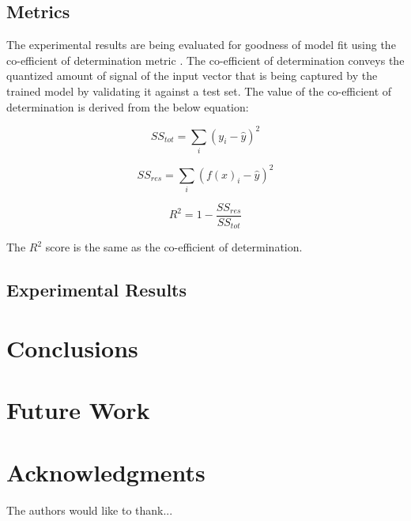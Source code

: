 \documentclass[conference]{IEEEtran}
\begin{document}
\subsection{Metrics}
The experimental results are being evaluated for goodness of model fit using the co-efficient of determination metric \cite{jaeger1990statistics}.
The co-efficient of determination conveys the quantized amount of signal of the input vector that is being captured by the trained model by validating it against a test set. The value of the co-efficient of determination is derived from the below equation:

\begin{equation}
\displaystyle SS_{tot} = \sum_{i} (y_i - \hat{y})^2
\end{equation}

\begin{equation}
\displaystyle SS_{res} = \sum_{i} (f(x)_i - \hat{y})^2
\end{equation}

\begin{equation}
\displaystyle R^2 = 1 - \frac{SS_{res}}{SS_{tot}}
\end{equation}

The $R^2$ score is the same as the co-efficient of determination.


\subsection{Experimental Results}



\section{Conclusions}


\section{Future Work}


\section{Acknowledgments}
The authors would like to thank...




\end{document}
